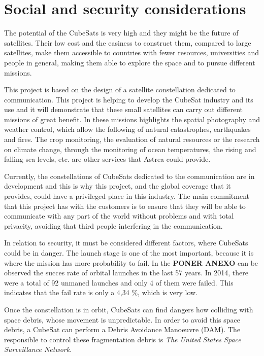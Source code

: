 \chapter{Social and security considerations}
The potential of the CubeSats is very high and they might be the future of satellites. Their low cost and the easiness to construct them, compared to large satellites, make them accessible to countries with fewer resources, universities and people in general, making them able to explore the space and to pursue different missions.

This project is based on the design of a satellite constellation dedicated to communication. This project is helping to develop the CubeSat industry and its use and it will demonstrate that these small satellites can carry out different missions of great benefit. In these missions highlights the spatial photography and weather control, which allow the following of natural catastrophes, earthquakes and fires. The crop monitoring, the evaluation of natural resources or the research on climate change, through the monitoring of ocean temperatures, the rising and falling sea levels, etc. are other services that Astrea could provide. 

Currently, the constellations of CubeSats dedicated to the communication are in development and this is why this project, and the global coverage that it provides, could have a privileged place in this industry. The main commitment that this project has with the customers is to ensure that they will be able to communicate with any part of the world without problems and with total privacity, avoiding that third people interfering in the communication.

In relation to security, it must be considered different factors, where CubeSats could be in danger. The launch stage is one of the most important, because it is where the mission has more probability to fail. In the \textbf{PONER ANEXO} can be observed the succes rate of orbital launches in the last 57 years. In 2014, there were a total of 92 unmaned launches and only 4 of them were failed. This indicates that the fail rate is only a 4,34 \%, which is very low. 

Once the constellation is in orbit, CubeSats can find dangers how colliding with space debris, whose movement is unpredictable. In order to avoid this space debris, a CubeSat can perform a Debris Avoidance Manoeuvre (DAM). The responsible to control these fragmentation debris is \textit{The United States Space Surveillance Network}.